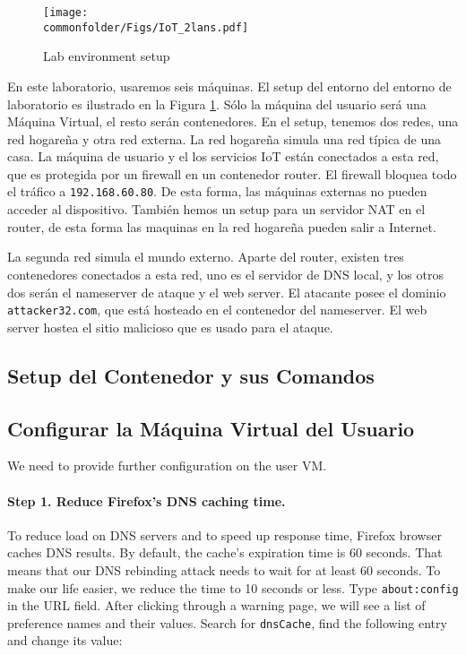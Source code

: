 \begin{figure}[htb]
\centering
\texttt{[image: \\commonfolder/Figs/IoT\_2lans.pdf]}
\caption{Lab environment setup}
\label{rebind:fig:labsetup}
\end{figure}

En este laboratorio, usaremos seis máquinas.
El setup del entorno del entorno de laboratorio es ilustrado en la Figura \ref{rebind:fig:labsetup}. Sólo la máquina del usuario será una Máquina Virtual, el resto serán contenedores.
En el setup, tenemos dos redes, una red hogareña y otra red externa. La red hogareña simula una red típica de una casa. La máquina de usuario y el los servicios IoT están conectados a esta red, que es protegida por un firewall en un contenedor router. El firewall bloquea todo el tráfico  a \texttt{192.168.60.80}. De esta forma, las máquinas externas no pueden acceder al dispositivo.
También hemos un setup para un servidor NAT en el router, de esta forma las maquinas en la red hogareña pueden salir a Internet.

La segunda red simula el mundo externo. Aparte del router, existen tres contenedores conectados a esta red, uno es el servidor de DNS local, y los otros dos serán el nameserver de ataque y el web server.
El atacante posee el dominio \texttt{attacker32.com}, que está hosteado en el contenedor del nameserver. El web server hostea el sitio malicioso que es usado para el ataque.


\subsection{Setup del Contenedor y sus Comandos}






\subsection{Configurar la Máquina Virtual del Usuario}

We need to provide further configuration on the user VM.


\paragraph{Step 1. Reduce Firefox's DNS caching time.}
To reduce load on DNS servers and to speed up response time, Firefox browser caches DNS
results.  By default, the cache's expiration time is 60 seconds. That means that our DNS
rebinding attack needs to wait for at least 60 seconds. To make our life easier, we reduce
the time to 10 seconds or less. Type \texttt{about:config} in the URL field.
After clicking through a warning page, we will see a list of preference names and their values.
Search for \texttt{dnsCache}, find the following entry and change its value:

